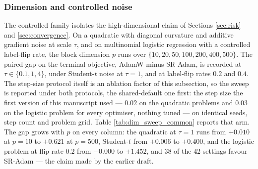 \documentclass[a4paper,fleqn]{cas-sc}
\theoremstyle{plain}
\theoremstyle{definition}
\theoremstyle{remark}
\begin{document}
\subsubsection{Dimension and controlled noise}

The controlled family isolates the high-dimensional claim of Sections \ref{sec:risk} and \ref{sec:convergence}. On a quadratic with diagonal curvature and additive gradient noise at scale $\tau$, and on multinomial logistic regression with a controlled label-flip rate, the block dimension $p$ runs over $\{10,20,50,100,200,400,500\}$. The paired gap on the terminal objective, AdamW minus SR-Adam, is recorded at $\tau\in\{0.1,1,4\}$, under Student-$t$ noise at $\tau=1$, and at label-flip rates $0.2$ and $0.4$. The step-size protocol itself is an ablation factor of this subsection, so the sweep is reported under both protocols, the shared-default one first: the step size the first version of this manuscript used --- $0.02$ on the quadratic problems and $0.03$ on the logistic problem for every optimiser, nothing tuned --- on identical seeds, step count and problem grid. Table \ref{tab:dim_sweep_common} reports that arm. The gap grows with $p$ on every column: the quadratic at $\tau=1$ runs from $+0.010$ at $p=10$ to $+0.621$ at $p=500$, Student-$t$ from $+0.006$ to $+0.400$, and the logistic problem at flip rate $0.2$ from $+0.000$ to $+1.452$, and $38$ of the $42$ settings favour SR-Adam --- the claim made by the earlier draft.
\end{document}

